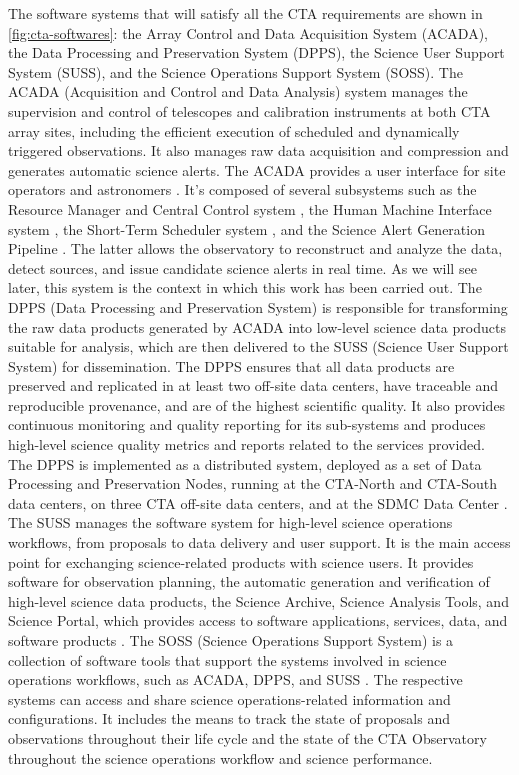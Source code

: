 The software systems that will satisfy all the CTA requirements are shown in \autoref{fig:cta-softwares}: the Array Control and Data Acquisition System (ACADA), the Data Processing and Preservation System (DPPS), the Science User Support System (SUSS), and the Science Operations Support System (SOSS). 
The ACADA (Acquisition and Control and Data Analysis) system manages the supervision and control of telescopes and calibration instruments at both CTA array sites, including the efficient execution of scheduled and dynamically triggered observations. It also manages raw data acquisition and compression and generates automatic science alerts. The ACADA provides a user interface for site operators and astronomers \cite{Oya2017}. It's composed of several subsystems such as the Resource Manager and Central Control system \cite{Melkumyan2019}, the Human Machine Interface system \cite{Sadeh2017}, the Short-Term Scheduler system \cite{Colome2014}, and the Science Alert Generation Pipeline \cite{Bulgarelli2014}. The latter allows the observatory to reconstruct and analyze the data, detect sources, and issue candidate science alerts in real time. As we will see later, this system is the context in which this work has been carried out. The DPPS (Data Processing and Preservation System) is responsible for transforming the raw data products generated by ACADA into low-level science data products suitable for analysis, which are then delivered to the SUSS (Science User Support System) for dissemination. The DPPS ensures that all data products are preserved and replicated in at least two off-site data centers, have traceable and reproducible provenance, and are of the highest scientific quality. It also provides continuous monitoring and quality reporting for its sub-systems and produces high-level science quality metrics and reports related to the services provided. The DPPS is implemented as a distributed system, deployed as a set of Data Processing and Preservation Nodes, running at the CTA-North and CTA-South data centers, on three CTA off-site data centers, and at the SDMC Data Center \cite{ctaobservatorywebsite}. The SUSS manages the software system for high-level science operations workflows, from proposals to data delivery and user support. It is the main access point for exchanging science-related products with science users. It provides software for observation planning, the automatic generation and verification of high-level science data products, the Science Archive, Science Analysis Tools, and Science Portal, which provides access to software applications, services, data, and software products \cite{Oya2017}. The SOSS (Science Operations Support System) is a collection of software tools that support the systems involved in science operations workflows, such as ACADA, DPPS, and SUSS \cite{ctaobservatorywebsite}. The respective systems can access and share science operations-related information and configurations. It includes the means to track the state of proposals and observations throughout their life cycle and the state of the CTA Observatory throughout the science operations workflow and science performance.


